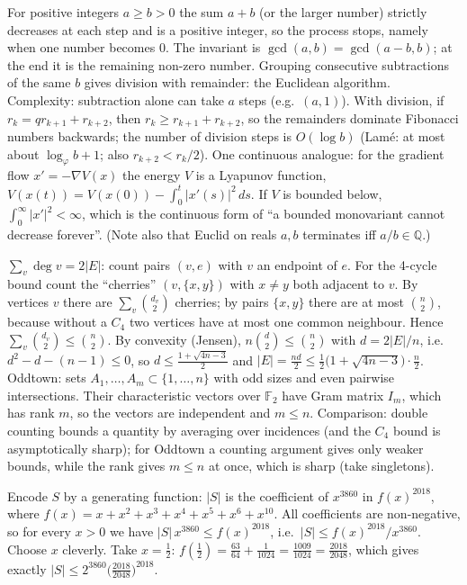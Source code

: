 \documentclass[11pt,a4paper]{article}
\begin{document}
 For positive integers $a\ge b>0$ the sum $a+b$ (or the larger number) strictly decreases at each step and is a positive integer, so the process stops, namely when one number becomes $0$.
 The invariant is $\gcd(a,b)=\gcd(a-b,b)$; at the end it is the remaining non-zero number. Grouping consecutive subtractions of the same $b$ gives division with remainder: the Euclidean algorithm.
 Complexity: subtraction alone can take $a$ steps (e.g.\ $(a,1)$). With division, if $r_{k}=q r_{k+1}+r_{k+2}$, then $r_k\ge r_{k+1}+r_{k+2}$, so the remainders dominate Fibonacci numbers backwards; the number of division steps is $O(\log b)$ (Lam\'e: at most about $\log_\varphi b+1$; also $r_{k+2}<r_k/2$).
 One continuous analogue: for the gradient flow $x'=-\nabla V(x)$ the energy $V$ is a Lyapunov function, $V(x(t))=V(x(0))-\int_0^t|x'(s)|^2\,ds$. If $V$ is bounded below, $\int_0^\infty|x'|^2<\infty$, which is the continuous form of ``a bounded monovariant cannot decrease forever''. (Note also that Euclid on reals $a,b$ terminates iff $a/b\in\mathbb Q$.)

 $\sum_v\deg v=2|E|$: count pairs $(v,e)$ with $v$ an endpoint of $e$. For the 4-cycle bound count the ``cherries'' $(v,\{x,y\})$ with $x\ne y$ both adjacent to $v$.
 By vertices $v$ there are $\sum_v\binom{d_v}{2}$ cherries; by pairs $\{x,y\}$ there are at most $\binom n2$, because without a $C_4$ two vertices have at most one common neighbour. Hence $\sum_v\binom{d_v}2\le\binom n2$.
 By convexity (Jensen), $n\binom{d}{2}\le\binom n2$ with $d=2|E|/n$, i.e.\ $d^2-d-(n-1)\le0$, so $d\le\frac{1+\sqrt{4n-3}}2$ and $|E|=\frac{nd}2\le\frac12\bigl(1+\sqrt{4n-3}\bigr)\cdot\frac n2$.
 Oddtown: sets $A_1,\dots,A_m\subset\{1,\dots,n\}$ with odd sizes and even pairwise intersections. Their characteristic vectors over $\mathbb F_2$ have Gram matrix $I_m$, which has rank $m$, so the vectors are independent and $m\le n$. Comparison: double counting bounds a quantity by averaging over incidences (and the $C_4$ bound is asymptotically sharp); for Oddtown a counting argument gives only weaker bounds, while the rank gives $m\le n$ at once, which is sharp (take singletons).

 Encode $S$ by a generating function: $|S|$ is the coefficient of $x^{3860}$ in $f(x)^{2018}$, where $f(x)=x+x^2+x^3+x^4+x^5+x^6+x^{10}$.
 All coefficients are non-negative, so for every $x>0$ we have $|S|\,x^{3860}\le f(x)^{2018}$, i.e.\ $|S|\le f(x)^{2018}/x^{3860}$. Choose $x$ cleverly.
 Take $x=\frac12$: $f(\frac12)=\frac{63}{64}+\frac1{1024}=\frac{1009}{1024}=\frac{2018}{2048}$, which gives exactly $|S|\le2^{3860}\bigl(\frac{2018}{2048}\bigr)^{2018}$.
\end{document}

